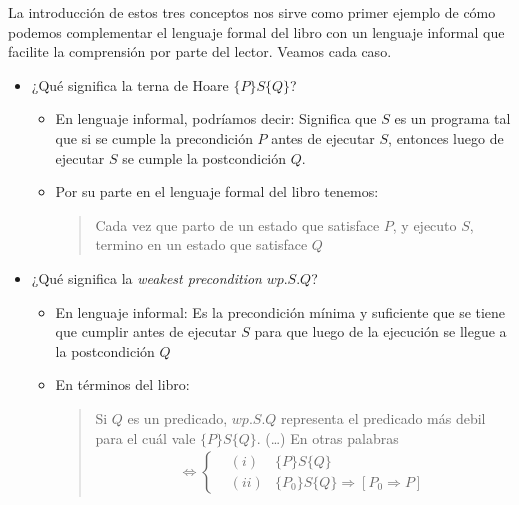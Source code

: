 \documentclass[11pt, a4paper, openany]{book}
\begin{document}
    La introducción de estos tres conceptos nos sirve como primer ejemplo de cómo podemos complementar el lenguaje formal del libro con un lenguaje informal que facilite la comprensión por parte del lector. Veamos cada caso.
    \begin{itemize}
        \item ¿Qué significa la terna de Hoare
        \begin{math}
            \{P\}S\{Q\}
        \end{math}?
        \begin{itemize}
            \item En lenguaje informal, podríamos decir: Significa que $S$ es un programa tal que si se cumple la precondición $P$ antes de ejecutar $S$, entonces luego de ejecutar $S$ se cumple la postcondición $Q$.
            \item Por su parte en el lenguaje formal del libro tenemos:
            \begin{quote}
                Cada vez que parto de un estado que satisface $P$, y ejecuto $S$, termino en un estado que satisface $Q$
            \end{quote}
        \end{itemize}
        \item ¿Qué significa la \textit{weakest precondition}
        \begin{math}
            wp.S.Q
        \end{math}?
        \begin{itemize}
            \item En lenguaje informal: Es la precondición mínima y suficiente que se tiene que cumplir antes de ejecutar $S$ para que luego de la ejecución se llegue a la postcondición $Q$
            \item En términos del libro:
            \begin{quote}
                Si $Q$ es un predicado, $wp.S.Q$ representa el predicado más debil para el cuál vale $\{P\}S\{Q\}$. (\dots) En otras palabras
                \begin{align*}
                    [wp.S.Q = P] \Longleftrightarrow \left\{
                        \begin{matrix}
                         &(i) & \{P\}S\{Q\} \\ 
                         &(ii) & \{P_{0}\}S\{Q\} \Rightarrow [P_{0} \Rightarrow P]
                        \end{matrix}\right.
                \end{align*}

\end{quote}
\end{itemize}
\end{itemize}
\end{document}
